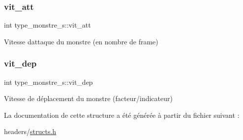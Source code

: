 \subsubsection{\texorpdfstring{vit\+\_\+att}{vit\_att}}
{\footnotesize\ttfamily int type\+\_\+monstre\+\_\+s\+::vit\+\_\+att}

Vitesse d\textquotesingle{}attaque du monstre (en nombre de frame) \mbox{\label{structtype__monstre__s_a768470695da3d9377f1e7e97a3c45ed7}} 
\subsubsection{\texorpdfstring{vit\+\_\+dep}{vit\_dep}}
{\footnotesize\ttfamily int type\+\_\+monstre\+\_\+s\+::vit\+\_\+dep}

Vitesse de déplacement du monstre (facteur/indicateur) 

La documentation de cette structure a été générée à partir du fichier suivant \+:\begin{DoxyCompactItemize}
\item 
headers/\hyperlink{structs_8h}{structs.\+h}\end{DoxyCompactItemize}
